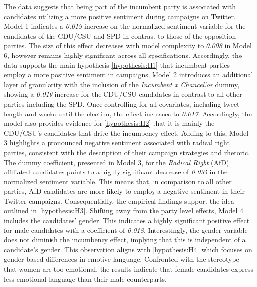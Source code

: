 \documentclass[a4paper,11pt]{article}
\begin{document}
The data suggests that being part of the incumbent party is associated with candidates utilizing a more positive sentiment during campaigns on Twitter. Model 1 indicates a \emph{0.019} increase on the normalized sentiment variable for the candidates of the CDU/CSU and SPD in contrast to those of the opposition parties. The size of this effect decreases with model complexity to \emph{0.008} in Model 6, however remains highly significant across all specifications. Accordingly, the data supports the main hypothesis \ref{hypothesis:H1} that incumbent parties employ a more positive sentiment in campaigns.
Model 2 introduces an additional layer of granularity with the inclusion of the \emph{Incumbent x Chancellor} dummy, showing a \emph{0.010} increase for the CDU/CSU candidates in contrast to all other parties including the SPD. Once controlling for all covariates, including tweet length and weeks until the election, the effect increases to \emph{0.017}. Accordingly, the model also provides evidence for \ref{hypothesis:H2} that it is mainly the CDU/CSU's candidates that drive the incumbency effect. Adding to this, Model 3 highlights a pronounced negative sentiment associated with radical right parties, consistent with the description of their campaign strategies and rhetoric. The dummy coefficient, presented in Model 3, for the \emph{Radical Right} (AfD) affiliated candidates points to a highly significant decrease of \emph{0.035} in the normalized sentiment variable. This means that, in comparison to all other parties, AfD candidates are more likely to employ a negative sentiment in their Twitter campaigns. Consequentially, the empirical findings support the idea outlined in \ref{hypothesis:H3}.
Shifting away from the party level effects, Model 4 includes the candidates' gender. This indicates a highly significant positive effect for male candidates with a coefficient of \emph{0.018}. Interestingly, the gender variable does not diminish the incumbency effect, implying that this is independent of a candidate's gender. This observation aligns with \ref{hypothesis:H4} which focuses on gender-based differences in emotive language. Confronted with the stereotype that women are too emotional, the results indicate that female candidates express less emotional language than their male counterparts.
\end{document}
